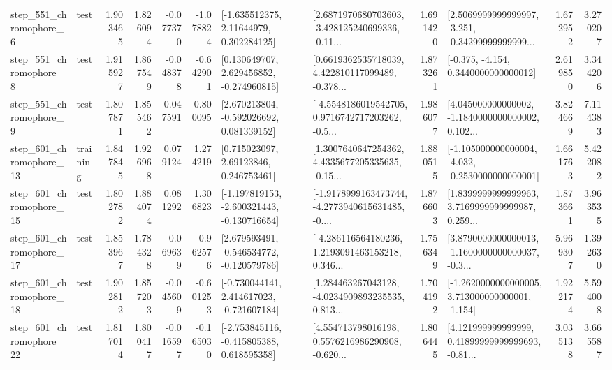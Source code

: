 \begin{tabular}{llrrrrllrlrr}
   step\_551\_chromophore\_6 &      test &      1.903465 &    1.826094 &     -0.077370 & -1.078824 &     [-1.635512375, 2.11644979, 0.302284125] &  [2.6871970680703603, -3.428125240699336, -0.11... &       1.691420 &  [2.5069999999999997, -3.251, -0.34299999999999... &            1.672952 &          3.270207 \\
   step\_551\_chromophore\_8 &      test &      1.915927 &    1.867549 &     -0.048378 & -0.642901 &    [0.130649707, 2.629456852, -0.274960815] &  [0.6619362535718039, 4.422810117099489, -0.378... &       1.873261 &               [-0.375, -4.154, 0.3440000000000012] &            2.619850 &          3.344206 \\
   step\_551\_chromophore\_9 &      test &      1.807871 &    1.855462 &      0.047591 &  0.800095 &    [2.670213804, -0.592026692, 0.081339152] &  [-4.5548186019542705, 0.9716742717203262, -0.5... &       1.986077 &  [4.045000000000002, -1.1840000000000002, 0.102... &            3.824669 &          7.114383 \\
  step\_601\_chromophore\_13 &  training &      1.847845 &    1.926968 &      0.079124 &  1.274219 &      [0.715023097, 2.69123846, 0.246753461] &  [1.3007640647254362, 4.4335677205335635, -0.15... &       1.880515 &  [-1.105000000000004, -4.032, -0.2530000000000001] &            1.661763 &          5.422082 \\
  step\_601\_chromophore\_15 &      test &      1.802782 &    1.884074 &      0.081292 &  1.306823 &  [-1.197819153, -2.600321443, -0.130716654] &  [-1.9178999163473744, -4.2773940615631485, -0.... &       1.876603 &  [1.8399999999999963, 3.7169999999999987, 0.259... &            1.873661 &          3.963535 \\
  step\_601\_chromophore\_17 &      test &      1.853967 &    1.784328 &     -0.069639 & -0.962576 &   [2.679593491, -0.546534772, -0.120579786] &  [-4.286116564180236, 1.2193091463153218, 0.346... &       1.756349 &  [3.8790000000000013, -1.1600000000000037, -0.3... &            5.969307 &          1.392630 \\
  step\_601\_chromophore\_18 &      test &      1.902812 &    1.857203 &     -0.045609 & -0.601253 &   [-0.730044141, 2.414617023, -0.721607184] &  [1.284463267043128, -4.0234909893235535, 0.813... &       1.704192 &   [-1.2620000000000005, 3.713000000000001, -1.154] &            1.922174 &          5.594008 \\
  step\_601\_chromophore\_22 &      test &      1.817014 &    1.800417 &     -0.016597 & -0.165030 &   [-2.753845116, -0.415805388, 0.618595358] &  [4.554713798016198, 0.5576216986290908, -0.620... &       1.806445 &  [4.121999999999999, 0.41899999999999693, -0.81... &            3.035138 &          3.665587 \\

\end{tabular}
